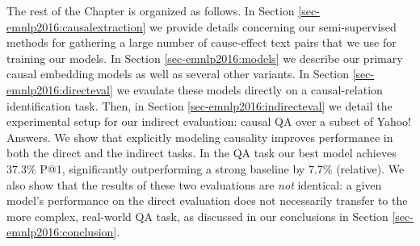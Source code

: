 The rest of the Chapter is organized as follows.  
In Section \ref{sec-emnlp2016:causalextraction} we provide details concerning our semi-supervised methods for gathering a large number of cause-effect text pairs that we use for training our models.  In Section \ref{sec-emnlp2016:models} we describe our primary causal embedding models as well as several other variants.  In Section \ref{sec-emnlp2016:directeval} we evaulate these models directly on a causal-relation identification task.  Then, in Section \ref{sec-emnlp2016:indirecteval} we detail the experimental setup for our indirect evaluation: causal QA over a subset of Yahoo! Answers.  We show that explicitly modeling causality improves performance in both the direct and the indirect tasks. In the QA task our best model achieves 37.3\% P@1, significantly outperforming a strong baseline by 7.7\% (relative).
We also show that the results of these two evaluations are \emph{not} identical: a given model's performance on the direct evaluation does not necessarily transfer to the more complex, real-world QA task, as discussed in our conclusions in Section \ref{sec-emnlp2016:conclusion}.


